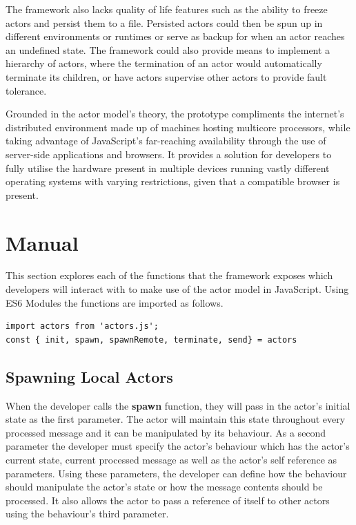 \documentclass[12pt, a4paper]{report}
\theoremstyle{definition}
\theoremstyle{definition}%
\theoremstyle{definition}%
\theoremstyle{definition}%
\theoremstyle{definition}%
\theoremstyle{definition}%
\begin{document}
The framework also lacks quality of life features such as the ability to freeze actors and persist them to a file. Persisted actors could then be spun up in different environments or runtimes or serve as backup for when an actor reaches an undefined state. The framework could also provide means to implement a hierarchy of actors, where the termination of an actor would automatically terminate its children, or have actors supervise other actors to provide fault tolerance.

Grounded in the actor model's theory, the prototype compliments the internet's distributed environment made up of machines hosting multicore processors, while taking advantage of JavaScript's far-reaching availability through the use of server-side applications and browsers. It provides a solution for developers to fully utilise the hardware present in multiple devices running vastly different operating systems with varying restrictions, given that a compatible browser is present.
\appendix
\chapter{Manual}
This section explores each of the functions that the framework exposes which developers will interact with to make use of the actor model in JavaScript. Using ES6 Modules the functions are imported as follows.
\begin{lstlisting}
import actors from 'actors.js';
const { init, spawn, spawnRemote, terminate, send} = actors
\end{lstlisting}
\section{Spawning Local Actors}
When the developer calls the \textbf{spawn} function, they will pass in the actor's initial state as the first parameter. The actor will maintain this state throughout every processed message and it can be manipulated by its behaviour. As a second parameter the developer must specify the actor's behaviour which has the actor's current state, current processed message as well as the actor's self reference as parameters. Using these parameters, the developer can define how the behaviour should manipulate the actor's state or how the message contents should be processed. It also allows the actor to pass a reference of itself to other actors using the behaviour's third parameter.
\end{document}

